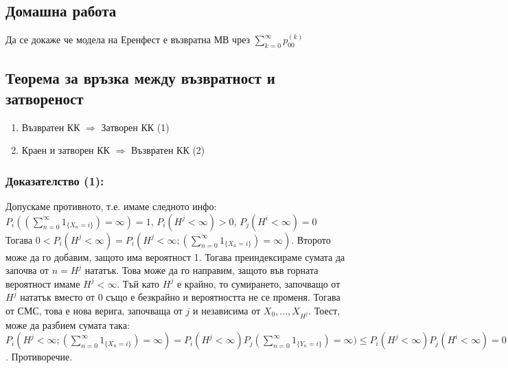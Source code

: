 \documentclass{article}
\begin{document}
\subsection*{Домашна работа}
Да се докаже че модела на Еренфест е възвратна МВ чрез $\sum_{k=0}^\infty p_{00}^{(k)}$

\subsection{Теорема за връзка между възвратност и затвореност}
\begin{enumerate}
\item Възвратен КК $\Rightarrow$ Затворен КК \quad (1)
\item Краен и затворен КК $\Rightarrow$ Възвратен КК \quad (2)
\end{enumerate}

\subsubsection*{Доказателство (1):}
Допускаме противното, т.е. имаме следното инфо: \\
$P_i\left(\left(\sum_{n=0}^\infty 1_{\{X_n = i\}}\right) = \infty\right) = 1$, $P_i(H^j < \infty) > 0$, $P_j(H^i < \infty) = 0$ \\
Тогава $0 < P_i(H^j < \infty) = P_i\left(H^j < \infty; \left(\sum_{n=0}^\infty 1_{\{X_n = i\}}\right) = \infty\right)$. Второто може да го добавим, 
защото има вероятност 1. Тогава преиндексираме сумата да започва от $n = H^j$ нататък. 
Това може да го направим, защото във горната вероятност имаме $H^j < \infty$. Тъй като $H^j$ е крайно, 
то сумирането, започващо от $H^j$ нататък вместо от 0 също е безкрайно и вероятността не се променя. 
Тогава от СМС, това е нова верига, започваща от $j$ и независима от $X_0,...,X_{H^j}$. Тоест, може да разбием сумата така: \\
$P_i\left(H^j < \infty; \left(\sum_{n=0}^\infty 1_{\{X_n = i\}}\right) = \infty\right) = P_i(H^j < \infty)P_j\left(\sum_{n=0}^\infty 1_{\{Y_n = i\}}\right) = \infty) \leq P_i(H^j < \infty)P_j(H^i < \infty) = 0$. Противоречие.
\end{document}
